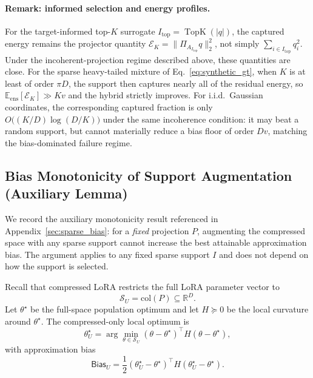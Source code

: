 \paragraph{Remark: informed selection and energy profiles.}
For the target-informed top-$K$ surrogate $I_{\mathrm{top}}=\operatorname{TopK}(|q|)$, the captured energy remains the projector quantity
$\mathcal E_K=\|\Pi_{A_{I_{\mathrm{top}}}}q\|_2^2$, not simply $\sum_{i\in I_{\mathrm{top}}}q_i^2$.
Under the incoherent-projection regime described above, these quantities are close.
For the sparse heavy-tailed mixture of Eq.~\eqref{eq:synthetic_gt}, when $K$ is at least of order $\pi D$, the support then captures nearly all of the residual energy, so $\mathbb E_{\mathrm{ens}}[\mathcal E_K]\gg Kv$ and the hybrid strictly improves.
For i.i.d.\ Gaussian coordinates, the corresponding captured fraction is only $O\big((K/D)\log(D/K)\big)$ under the same incoherence condition: it may beat a random support, but cannot materially reduce a bias floor of order $Dv$, matching the bias-dominated failure regime.

\subsection{Bias Monotonicity of Support Augmentation (Auxiliary Lemma)}
\label{app:sparse_bias_reduction}

We record the auxiliary monotonicity result referenced in Appendix~\ref{sec:sparse_bias}: for a \emph{fixed} projection $P$, augmenting the compressed space with any sparse support cannot increase the best attainable approximation bias.
The argument applies to any fixed sparse support $I$ and does not depend on how the support is selected.

Recall that compressed LoRA restricts the full LoRA parameter vector to
\begin{equation}
\mathcal{S}_U=\mathrm{col}(P)\subseteq\mathbb{R}^D.
\label{eq:app_compressed_space}
\end{equation}
Let $\theta^\star$ be the full-space population optimum and let $H\succeq 0$ be the local curvature around $\theta^\star$.
The compressed-only local optimum is
\begin{equation}
\theta^\star_U
=
\arg\min_{\theta\in\mathcal{S}_U}
(\theta-\theta^\star)^\top
H
(\theta-\theta^\star),
\label{eq:app_compressed_local_optimum}
\end{equation}
with approximation bias
\begin{equation}
\mathsf{Bias}_{U}
=
\frac{1}{2}
(\theta^\star_U-\theta^\star)^\top
H
(\theta^\star_U-\theta^\star).
\label{eq:app_compressed_bias}
\end{equation}

